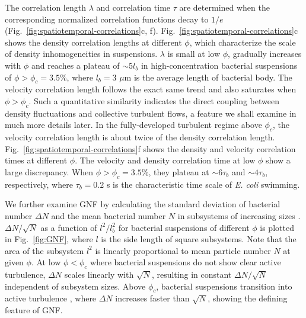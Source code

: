 \documentclass[twocolumn,aps,prl,amsmath,amssymb,longbibliography]{revtex4-2}
\begin{document}
The correlation length $\lambda$ and correlation time $\tau$ are determined when the corresponding normalized correlation functions decay to $1/e$ (Fig.~\ref{fig:spatiotemporal-correlations}c, f). Fig.~\ref{fig:spatiotemporal-correlations}c shows the density correlation lengths at different $\phi$, which characterize the scale of density inhomogeneities in suspensions.
$\lambda$ is small at low $\phi$, gradually increases with $\phi$ and reaches a plateau of $\sim 5l_b$ in high-concentration bacterial suspensions of $\phi > \phi_c = 3.5\%$, where $l_b=3$ $\mu$m is the average length of bacterial body. The velocity correlation length follows the exact same trend and also saturates when $\phi > \phi_c$. Such a quantitative similarity indicates the direct coupling between density fluctuations and collective turbulent flows, a feature we shall examine in much more details later. In the fully-developed turbulent regime above $\phi_c$, the velocity correlation length is about twice of the density correlation length.
Fig.~\ref{fig:spatiotemporal-correlations}f shows the density and velocity correlation times at different $\phi$. The velocity and density correlation time at low $\phi$ show a large discrepancy. When $\phi > \phi_c=3.5\%$, they plateau at $\sim 6\tau_b$ and $\sim 4\tau_b$, respectively, where $\tau_b=0.2$ s is the characteristic time scale of \textit{E. coli} swimming.

We further examine GNF by calculating the standard deviation of bacterial number $\Delta N$ and the mean bacterial number $N$ in subsystems of increasing sizes \cite{Liu2020}. $\Delta N / \sqrt N$ as a function of $l^2/l_b^2$ for bacterial suspensions of different $\phi$ is plotted in Fig.~\ref{fig:GNF}, where $l$ is the side length of square subsystems.
Note that the area of the subsystem $l^2$ is linearly proportional to mean particle number $N$ at given $\phi$. At low $\phi<\phi_c$ where bacterial suspensions do not show clear active turbulence, $\Delta N$ scales linearly with $\sqrt N$, resulting in constant $\Delta N / \sqrt N$ independent of subsystem sizes. Above $\phi_c$, bacterial suspensions transition into active turbulence \cite{Peng2020}, where $\Delta N$ increases faster than $\sqrt N$, showing the defining feature of GNF.
\end{document}
